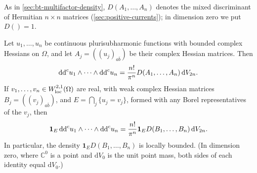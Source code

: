 As in \cref{sec:bt-multifactor-density}, $D(A_1,\dots,A_n)$ denotes the mixed discriminant of Hermitian $n\times n$ matrices (\cref{sec:positive-currents}); in dimension zero we put $D()=1$.

\begin{proposition}\label{prop:bounded-complex-hessian-density}
Let $u_1,\dots,u_n$ be continuous plurisubharmonic functions with bounded complex Hessians on $\Omega$, and let $A_j=((u_j)_{a\bar b})$ be their complex Hessian matrices. Then
\[
 \mathrm{dd}^{\mathrm{c}} u_1\wedge\cdots\wedge\mathrm{dd}^{\mathrm{c}} u_n
       =\frac{n!}{\pi^n}D(A_1,\dots,A_n)\,\mathrm dV_{2n}.
\]
If $v_1,\dots,v_n\in W^{2,1}_{\mathrm{loc}}(\Omega)$ are real, with weak complex Hessian matrices $B_j=((v_j)_{a\bar b})$, and $E=\bigcap_j\{u_j=v_j\}$, formed with any Borel representatives of the $v_j$, then
\[
 \mathbf1_E\,\mathrm{dd}^{\mathrm{c}} u_1\wedge\cdots\wedge\mathrm{dd}^{\mathrm{c}} u_n
       =\frac{n!}{\pi^n}\mathbf1_E D(B_1,\dots,B_n)\,\mathrm dV_{2n}.
\]
In particular, the density $\mathbf1_ED(B_1,\dots,B_n)$ is locally bounded. (In dimension zero, where $\mathbb C^0$ is a point and $\mathrm dV_0$ is the unit point mass, both sides of each identity equal $\mathrm dV_0$.)
\end{proposition}
